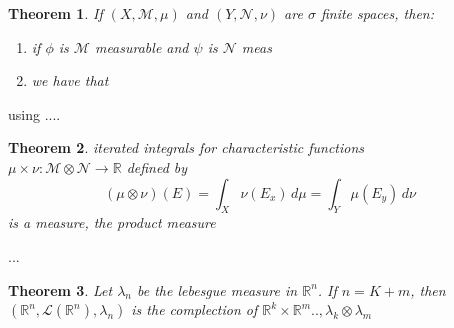 \documentclass[a4paper,12pt]{article}
\theoremstyle{break}
\newtheorem{theorem}{Theorem}[section]
\newcommand{\real}{\mathbb{R}}
\numberwithin{equation}{section}
\begin{document}
\begin{theorem}
    If \(\left(X, \mathcal{M}, \mu \right)\) and \(\left(Y, \mathcal{N}, \nu \right)\) are \(\sigma\) finite spaces, then:
    \begin{enumerate}
        \item if \(\phi\) is \(\mathcal{M}\) measurable and \(\psi\) is \( \mathcal{N}\) meas
        \item we have that 
    \end{enumerate}

 \end{theorem}
using ....

\begin{theorem}
    iterated integrals for characteristic functions \\ 
    \(\mu \times \nu : \mathcal{M} \otimes \mathcal{N} \rightarrow \mathbb{R} \) defined by
    \[ \left(\mu \otimes \nu \right)(E) = \int_X \nu(E_x) \, d\mu = \int_Y \mu(E_y) \, d\nu\]
    is a measure, the product measure 
\end{theorem}

...
\begin{theorem}
    Let \(\lambda_n\) be the lebesgue measure in \(\mathbb{R}^n\). If \(n= K+m\), then \(\left(\mathbb{R}^n, \mathcal{L}(\mathbb{R}^n), \lambda_n \right)\) is the complection of \(\real^k \times \real^m .., \lambda_k \otimes \lambda_m\)
\end{theorem}
\end{document}
